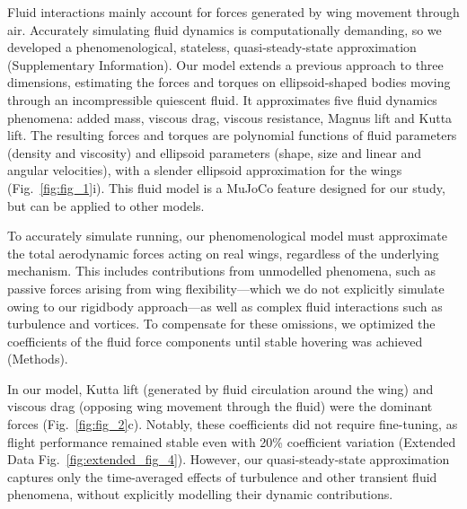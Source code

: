 \documentclass[sn-mathphys-num]{sn-jnl}%
\theoremstyle{thmstyleone}	%
\theoremstyle{thmstyletwo}	%
\theoremstyle{thmstylethree}	%
\begin{document}
Fluid interactions mainly account for forces generated by wing movement through air. 
Accurately simulating fluid dynamics is computationally demanding, so we developed a phenomenological, stateless, quasi-steady-state approximation (Supplementary Information). 
Our model extends a previous approach\cite{andersen2005analysis} to three dimensions, estimating the forces and torques on ellipsoid-shaped bodies moving through an incompressible quiescent fluid. 
It approximates five fluid dynamics phenomena: added mass\cite{lamb1993hydrodynamics,tuckerman1925inertia}, viscous drag\cite{duan2015sphere}, viscous resistance\cite{stokes1851effect}, Magnus lift\cite{seifert2012review} and Kutta lift\cite{kutta1902lift}. 
The resulting forces and torques are polynomial functions of fluid parameters (density and viscosity) and ellipsoid parameters (shape, size and linear and angular velocities), with a slender ellipsoid approximation for the wings (Fig.~\ref{fig:fig_1}i). 
This fluid model is a MuJoCo feature designed for our study, but can be applied to other models.


To accurately simulate running, our phenomenological model must approximate the total aerodynamic forces acting on real wings, regardless of the underlying mechanism. 
This includes contributions from unmodelled phenomena, such as passive forces arising from wing flexibility\cite{sane2003aerodynamics}—which we do not explicitly simulate owing to our rigidbody approach—as well as complex fluid interactions such as turbulence and vortices. 
To compensate for these omissions, we optimized the coefficients of the fluid force components until stable hovering was achieved (Methods).



In our model, Kutta lift (generated by fluid circulation around the wing) and viscous drag (opposing wing movement through the fluid) were the dominant forces (Fig.~\ref{fig:fig_2}c). 
Notably, these coefficients did not require fine-tuning, as flight performance remained stable even with 20\% coefficient variation (Extended Data Fig.~\ref{fig:extended_fig_4}). 
However, our quasi-steady-state approximation captures only the time-averaged effects of turbulence and other transient fluid phenomena, without explicitly modelling their dynamic contributions.
\end{document}
